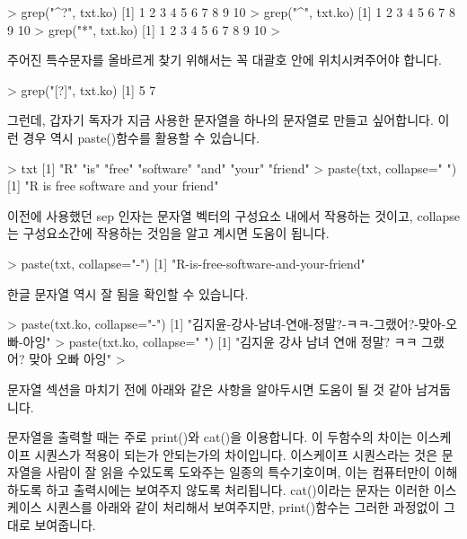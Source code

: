\begin{Schunk}
\begin{Soutput} 
> grep("^?", txt.ko)
 [1]  1  2  3  4  5  6  7  8  9 10
> grep("^", txt.ko)
 [1]  1  2  3  4  5  6  7  8  9 10
> grep("*", txt.ko)
 [1]  1  2  3  4  5  6  7  8  9 10
> 
\end{Soutput}
\end{Schunk}

주어진 특수문자를 올바르게 찾기 위해서는 꼭 대괄호 안에 위치시켜주어야 합니다. 

\begin{Schunk}
\begin{Soutput} 
> grep("[?]", txt.ko)
[1] 5 7
\end{Soutput}
\end{Schunk}

그런데, 갑자기 독자가 지금 사용한 문자열을 하나의 문자열로 만들고 싶어합니다.
이런 경우 역시 paste()함수를 활용할 수 있습니다.

\begin{Schunk}
\begin{Soutput} 
> txt
[1] "R"        "is"       "free"     "software" "and"      "your"     "friend"  
> paste(txt, collapse=" ")
[1] "R is free software and your friend"
\end{Soutput}
\end{Schunk}

이전에 사용했던 sep 인자는 문자열 벡터의 구성요소 내에서 작용하는 것이고, collapse는 구성요소간에 작용하는 것임을 알고 계시면 도움이 됩니다.  

\begin{Schunk}
\begin{Soutput} 
> paste(txt, collapse="-")
[1] "R-is-free-software-and-your-friend"
\end{Soutput}
\end{Schunk}

한글 문자열 역시 잘 됨을 확인할 수 있습니다. 

\begin{Schunk}
\begin{Soutput} 
> paste(txt.ko, collapse="-")
[1] "김지윤-강사-남녀-연애-정말?-ㅋㅋ-그랬어?-맞아-오빠-아잉"
> paste(txt.ko, collapse=" ")
[1] "김지윤 강사 남녀 연애 정말? ㅋㅋ 그랬어? 맞아 오빠 아잉"
> 
\end{Soutput}
\end{Schunk}


문자열 섹션을 마치기 전에 아래와 같은 사항을 알아두시면 도움이 될 것 같아 남겨둡니다. 

문자열을 출력할 때는 주로 print()와 cat()을 이용합니다. 
이 두함수의 차이는 이스케이프 시퀀스가 적용이 되는가 안되는가의 차이입니다.
이스케이프 시퀀스라는 것은 문자열을 사람이 잘 읽을 수있도록 도와주는 일종의 특수기호이며, 이는 컴퓨터만이 이해하도록 하고 출력시에는 보여주지 않도록 처리됩니다. 
cat()이라는 문자는 이러한 이스케이스 시퀀스를 아래와 같이 처리해서 보여주지만, print()함수는 그러한 과정없이 그대로 보여줍니다. 

